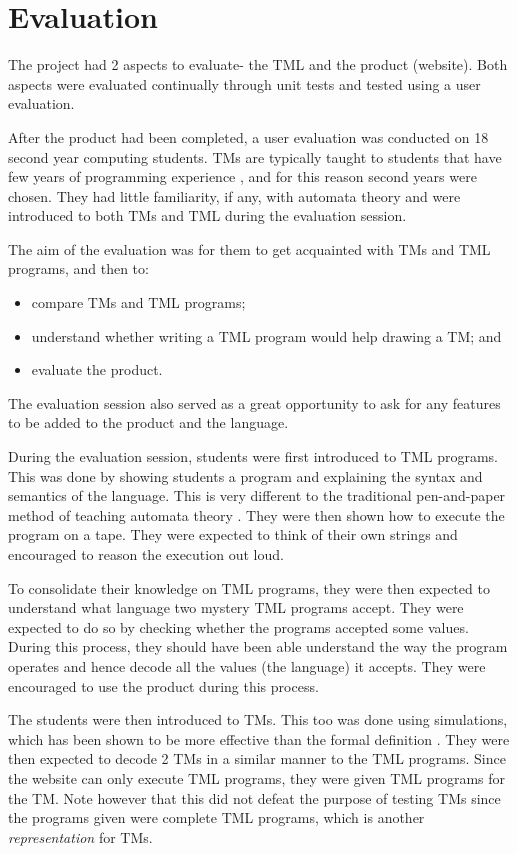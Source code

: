 \chapter{Evaluation} 

The project had 2 aspects to evaluate- the TML and the product (website). Both aspects were evaluated continually through unit tests and tested using a user evaluation.

After the product had been completed, a user evaluation was conducted on 18 second year computing students. TMs are typically taught to students that have few years of programming experience \citep{rodger2006jflap}, and for this reason second years were chosen. They had little familiarity, if any, with automata theory and were introduced to both TMs and TML during the evaluation session. 

The aim of the evaluation was for them to get acquainted with TMs and TML programs, and then to:
\begin{itemize}
    \item compare TMs and TML programs;
    \item understand whether writing a TML program would help drawing a TM; and
    \item evaluate the product.
\end{itemize}
The evaluation session also served as a great opportunity to ask for any features to be added to the product and the language.

During the evaluation session, students were first introduced to TML programs. This was done by showing students a program and explaining the syntax and semantics of the language. This is very different to the traditional pen-and-paper method of teaching automata theory \citep{zingaro2008another}. They were then shown how to execute the program on a tape. They were expected to think of their own strings and encouraged to reason the execution out loud.

To consolidate their knowledge on TML programs, they were then expected to understand what language two mystery TML programs accept. They were expected to do so by checking whether the programs accepted some values. During this process, they should have been able understand the way the program operates and hence decode all the values (the language) it accepts. They were encouraged to use the product during this process. 

The students were then introduced to TMs. This too was done using simulations, which has been shown to be more effective than the formal definition \citep{rodger2009increasing}. They were then expected to decode 2 TMs in a similar manner to the TML programs. Since the website can only execute TML programs, they were given TML programs for the TM. Note however that this did not defeat the purpose of testing TMs since the programs given were complete TML programs, which is another \textit{representation} for TMs.

